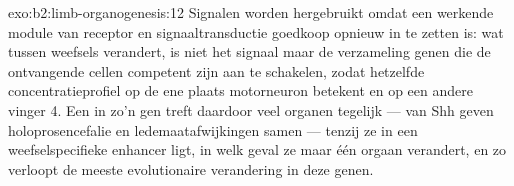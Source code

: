 \begin{solution}{exo:b2:limb-organogenesis:12}
Signalen worden hergebruikt omdat een werkende module van receptor en
signaaltransductie goedkoop opnieuw in te zetten is: wat tussen weefsels
verandert, is niet het signaal maar de verzameling genen die de ontvangende
cellen competent zijn aan te schakelen, zodat hetzelfde
concentratieprofiel op de ene plaats motorneuron betekent en op een andere
vinger 4. Een  in zo'n gen treft daardoor veel organen tegelijk ---
 van Shh geven holoprosencefalie en ledemaatafwijkingen samen ---
tenzij ze in een weefselspecifieke enhancer ligt, in welk geval ze maar één
orgaan verandert, en zo verloopt de meeste evolutionaire verandering in
deze genen.
\end{solution}

